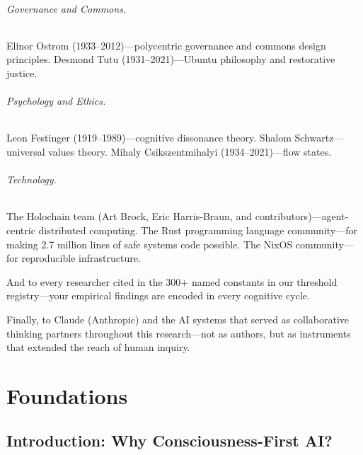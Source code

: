 \documentclass[12pt]{book}
\begin{document}
\paragraph{Governance and Commons.}
Elinor Ostrom (1933--2012)---polycentric governance and commons design principles.
Desmond Tutu (1931--2021)---Ubuntu philosophy and restorative justice.

\paragraph{Psychology and Ethics.}
Leon Festinger (1919--1989)---cognitive dissonance theory.
Shalom Schwartz---universal values theory.
Mihaly Csikszentmihalyi (1934--2021)---flow states.

\paragraph{Technology.}
The Holochain team (Art Brock, Eric Harris-Braun, and contributors)---agent-centric distributed computing.
The Rust programming language community---for making 2.7 million lines of safe systems code possible.
The NixOS community---for reproducible infrastructure.

\vspace{0.5cm}
And to every researcher cited in the 300+ named constants in our threshold registry---your empirical findings are encoded in every cognitive cycle.

Finally, to Claude (Anthropic) and the AI systems that served as collaborative thinking partners throughout this research---not as authors, but as instruments that extended the reach of human inquiry.

\tableofcontents

\mainmatter


\part{Foundations}

\chapter{Introduction: Why Consciousness-First AI?}
\label{ch:introduction}
\end{document}
